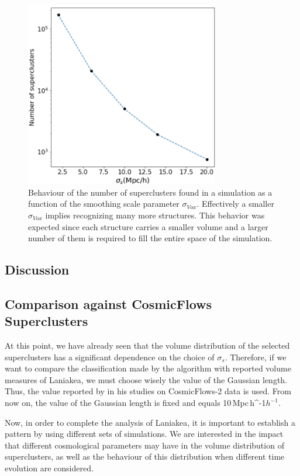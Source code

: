 \documentclass[usenatbib]{mnras}
\newcommand{\Mpch}{\,{\rm Mpc}\,\ifmmode h^{-1}\else $h^{-1}$\fi}
\begin{document}
\begin{figure}
    \centering
    \includegraphics[width=240pt]{num_superclusters.pdf}
    \caption{Behaviour of the number of superclusters found in a
      simulation as a function of the smoothing scale parameter
      $\sigma_{Vox}$. Effectively a smaller $\sigma_{Vox}$ implies
      recognizing many more structures. 
This behavior was expected since each structure carries a smaller
volume and a larger number of them is required to fill the entire
space of the simulation.}  
    \label{fig:Nclusters}
\end{figure}



\subsection{Discussion}

\subsection{Comparison against CosmicFlows Superclusters}

At this point, we have already seen that the volume distribution of the selected superclusters has a significant dependence on the choice of $\sigma_s$. Therefore, if we want to compare the classification made by the algorithm with reported volume measures of Laniakea, we must choose wisely the value of the Gaussian length. Thus, the value reported by \cite{2014Natur.513...71T} in his studies on CosmicFlows-2 data is used. From now on, the value of the Gaussian length is fixed and equals 10\Mpch. 

Now, in order to complete the analysis of Laniakea, it is important to
establish a pattern by using different sets of simulations. We are
interested in the impact that different cosmological parameters may
have in the volume distribution of superclusters, as well as the
behaviour of this distribution when different time evolution are
considered. 
\end{document}
